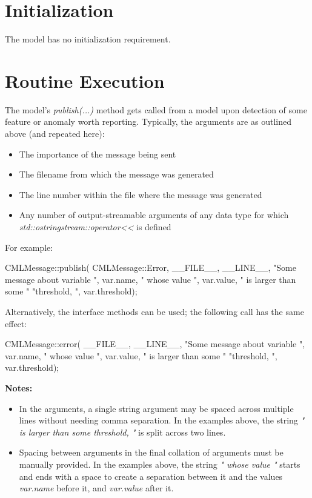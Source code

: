 \documentclass[11pt,fleqn]{report}
\begin{document}
\section{Initialization}
The model has no initialization requirement.

\section {Routine Execution}
The model's \textit{publish(...)} method gets called from a model upon
detection of some feature or anomaly worth reporting. Typically, the arguments
are as outlined above (and repeated here):
\begin{itemize}
\item The importance of the message being sent
\item The filename from which the message was generated
\item The line number within the file where the message was generated
\item Any number of output-streamable arguments of any data type for which \textit{std::ostringstream::operator<<} is defined
\end{itemize}

For example:
\begin{codeC}
  CMLMessage::publish( CMLMessage::Error,
                       __FILE__,
                       __LINE__,
                       "Some message about variable ", var.name,
                       " whose value ", var.value, " is larger than some "
                       "threshold, ", var.threshold);
\end{codeC}

Alternatively, the interface methods can be used; the following call has the
same effect:
\begin{codeC}
  CMLMessage::error( __FILE__,
                     __LINE__,
                     "Some message about variable ", var.name,
                     " whose value ", var.value, " is larger than some "
                     "threshold, ", var.threshold);
\end{codeC}

\textbf{Notes:}
\begin{itemize}
\item In the arguments, a single string argument may be spaced across
multiple lines without needing comma separation. In the examples above, the
string \textit{" is larger than some threshold, "} is split across two lines.

\item Spacing between arguments in the final collation of arguments must be
manually provided. In the examples above, the string \textit{" whose value "}
starts and ends with a space to create a separation between it and the
values \textit{var.name} before it, and \textit{var.value} after it.
\end{itemize}
\end{document}
